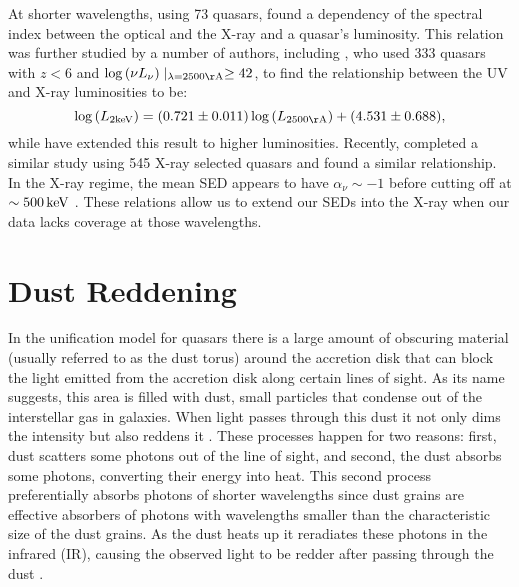 At shorter wavelengths, using 73 quasars, \citet{Avni:1982} found a dependency of the spectral index between the optical and the X-ray and a quasar's luminosity.  This relation was further studied by a number of authors, including \citet{Steffen:2006}, who used 333 quasars with $z<6$ and $\log{(\nu L_{\nu})}\mid_{\lambda=2500 {\rm \AA}} \geq 42$, to find the relationship between the UV and X-ray luminosities to be:
\begin{equation}
 \log{(L_{{\rm 2keV}})} = (0.721 \pm 0.011) \log{(L_{2500 {\rm \AA}})} + (4.531 \pm 0.688),
 \label{just_eq}
\end{equation}
while \citet{Just:2007} have extended this result to higher luminosities.
Recently, \citet{Lusso:2010} completed a similar study using 545 X-ray selected quasars and found a similar relationship.   In the X-ray regime, the mean SED appears to have $\alpha_{\nu}\sim-1$ \citep[e.g.,][]{George:2000} before cutting off at $\sim 500\,{\rm keV}$ \citep{Zdziarski:1995}.  These relations allow us to extend our SEDs into the X-ray when our data lacks coverage at those wavelengths. 

\section{Dust Reddening} \label{sec:dust_intro}

In the unification model for quasars \citep{Antonucci:1993,Urry:1995} there is a large amount of obscuring material (usually referred to as the dust torus) around the accretion disk that can block the light emitted from the accretion disk along certain lines of sight.  As its name suggests, this area is filled with dust, small particles that condense out of the interstellar gas in galaxies.  When light passes through this dust it not only dims the intensity but also reddens it \citep{Trumpler:1930, Pei:1992, Goobar:2008}.  These processes happen for two reasons: first, dust scatters some photons out of the line of sight, and second, the dust absorbs some photons, converting their energy into heat.  This second process preferentially absorbs photons of shorter wavelengths since dust grains are effective absorbers of photons with wavelengths smaller than the characteristic size of the dust grains.  As the dust heats up it reradiates these photons in the infrared (IR), causing the observed light to be redder after passing through the dust \citep{Binney:1998}.%

